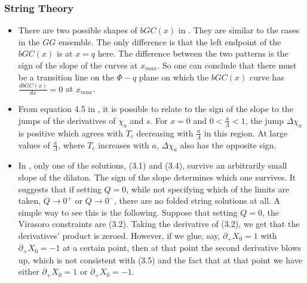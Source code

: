 \documentclass[11pt]{book}
\begin{document}
\subsubsection{String Theory}
\begin{itemize}
\item There are two possible shapes of $bGC\left(x\right)$ in \cite{xiao2015phase}.
They are similar to the cases in the $GG$ ensemble. The only difference
is that the left endpoint of the $bGC\left(x\right)$ is at $x=q$
here. The difference between the two patterns is the sign of the slope
of the curves at $x_{max}$. So one can conclude that there must be
a transition line on the $\Phi-q$ plane on which the $bGC\left(x\right)$
curve has $\frac{dbGC\left(x\right)}{dx}=0$ at $x_{max}$.
\item From equation 4.5 in \cite{gursoy2019inverse},
it is possible to relate to the sign of the slope to the jumps of
the derivatives of $\chi_{a}$ and $s$. For $x=0$ and $0<\frac{a}{\Lambda}<1$,
the jump $\Delta\chi_{a}$ is positive which agrees with $T_{c}$
decreasing with $\frac{a}{\Lambda}$ in this region. At large values
of $\frac{a}{\Lambda}$, where $T_{c}$ increases with $a$, $\Delta\chi_{a}$
also has the opposite sign.
\item In \cite{attali2019averaged},
only one of the solutions, (3.1) and (3.4), survive an arbitrarily
small slope of the dilaton. The sign of the slope determines which
one survives. It suggests that if setting $Q=0$, while not specifying
which of the limits are taken, $Q\rightarrow0^{+}$ or $Q\rightarrow0^{-}$,
there are no folded string solutions at all. A simple way to see this
is the following. Suppose that setting $Q=0$, the Virasoro constraints
are (3.2). Taking the derivative of (3.2), we get that the derivatives'
product is zeroed. However, if we glue, say, $\partial_{+}X_{0}=1$
with $\partial_{+}X_{0}=-1$ at a certain point, then at that point
the second derivative blows up, which is not consistent with (3.5)
and the fact that at that point we have either $\partial_{+}X_{0}=1$
or $\partial_{+}X_{0}=-1$.
\end{itemize}
\end{document}

